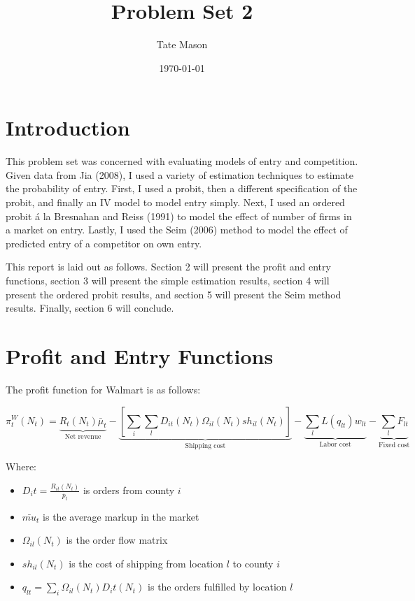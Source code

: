 \documentclass[11pt]{article}
\title{Problem Set 2}
\author{Tate Mason}
\date{\today}
\theoremstyle{definition}
\theoremstyle{remark}
\begin{document}
\maketitle
\thispagestyle{empty}


\newpage
\setcounter{page}{1}

\section{Introduction}

This problem set was concerned with evaluating models of entry and competition. Given data from Jia (2008), I used a variety of estimation techniques to estimate the probability of entry. First, I used a probit, then a different specification of the probit, and finally an IV model to model entry simply. Next, I used an ordered probit \'a la Bresnahan and Reiss (1991) to model the effect of number of firms in a market on entry. Lastly, I used the Seim (2006) method to model the effect of predicted entry of a competitor on own entry.

This report is laid out as follows. Section 2 will present the profit and entry functions, section 3 will present the simple estimation results, section 4 will present the ordered probit results, and section 5 will present the Seim method results. Finally, section 6 will conclude.

\section{Profit and Entry Functions}

The profit function for Walmart is as follows:

\begin{equation*}
  \pi_{t}^W(N_t) = \underbrace{R_t(N_t)\bar{\mu}_t}_{\text{Net revenue}} - \underbrace{[\sum_i\sum_lD_{it}(N_t)\Omega_{il}(N_t)sh_{il}(N_t)]}_{\text{Shipping cost}} - \underbrace{\sum_l L(q_{lt})w_{lt}}_{\text{Labor cost}} - \underbrace{\sum_lF_{lt}}_{\text{Fixed cost}}
\end{equation*}

Where:
\begin{itemize}
  \item $D_it = \frac{R_{it}(N_t)}{\bar{p}_t}$ is orders from county $i$
  \item $\bar{mu}_t$ is the average markup in the market
  \item $\Omega_{il}(N_t)$ is the order flow matrix
  \item $sh_{il}(N_t)$ is the cost of shipping from location $l$ to county $i$
  \item $q_{lt} = \sum_i\Omega_{il}(N_t)D_it(N_t)$ is the orders fulfilled by location $l$
\end{itemize}
\end{document}
